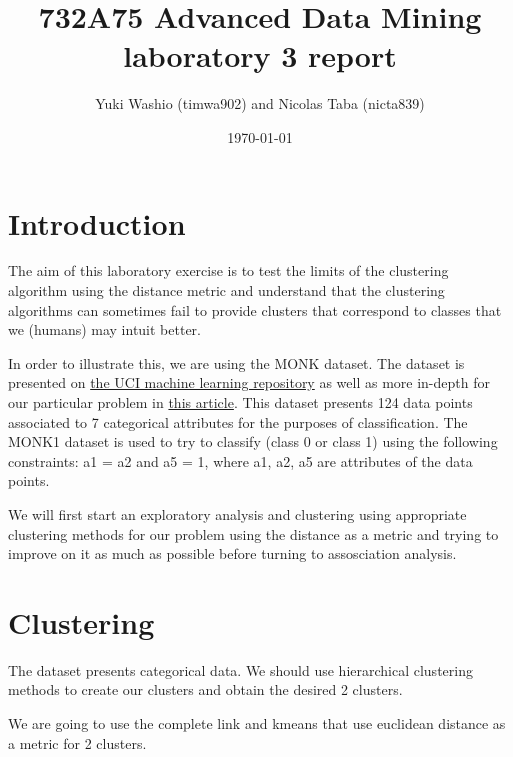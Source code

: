 \documentclass[letterpaper,12pt]{article}
\begin{document}
\title{732A75 Advanced Data Mining laboratory 3 report}
\author{Yuki Washio (timwa902) and Nicolas Taba (nicta839)}
\date{\today}
\maketitle



\section{Introduction}

The aim of this laboratory exercise is to test the limits of the clustering algorithm using the distance metric and understand that the clustering algorithms can sometimes fail to provide clusters that correspond to classes that we (humans) may intuit better.

In order to illustrate this, we are using the MONK dataset. The dataset is presented on \href{https://archive.ics.uci.edu/ml/datasets/MONK's+Problems}{the UCI machine learning repository} as well as more in-depth for our particular problem in \href{https://www.researchgate.net/publication/2293492_The_MONK's_Problems_A_Performance_Comparison_of_Different_Learning_Algorithms}{this article}.
This dataset presents 124 data points associated to 7 categorical attributes for the purposes of classification. The MONK1 dataset is used to try to classify (class 0 or class 1) using the following constraints: a1 = a2 and a5 = 1, where a1, a2, a5 are attributes of the data points.

We will first start an exploratory analysis and clustering using appropriate clustering methods for our problem using the distance as a metric and trying to improve on it as much as possible before turning to assosciation analysis.


\section{Clustering}

The dataset presents categorical data. We should use hierarchical clustering methods to create our clusters and obtain the desired 2 clusters.

We are going to use the complete link and kmeans that use euclidean distance as a metric for 2 clusters.
\end{document}
